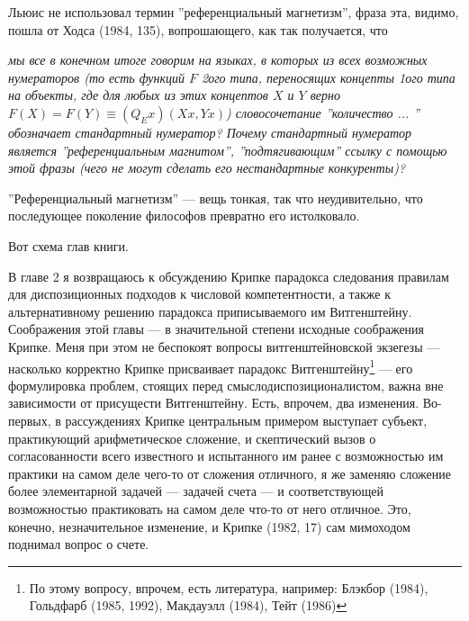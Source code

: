 \documentclass[12pt]{book}
\begin{document}
Льюис не использовал термин ''референциальный магнетизм'', фраза эта, видимо, пошла от Ходса (1984, 135), вопрошающего, как так получается, что

\smallskip

\textit{мы все в конечном итоге говорим на языках, в которых из всех возможных нумераторов (то есть функций \begin{math}F\end{math} 2ого типа, переносящих концепты 1ого типа на объекты, где для любых из этих концептов \begin{math}X\end{math} и \begin{math}Y\end{math} верно \begin{math}F(X)=F(Y)\equiv (Q_{E}x)(Xx, Yx)\end{math}) словосочетание ''количество ... '' обозначает стандартный нумератор? Почему стандартный нумератор является ''референциальным магнитом'', ''подтягивающим'' ссылку с помощью этой фразы (чего не могут сделать его нестандартные конкуренты)?}

\smallskip

''Референциальный магнетизм'' --- вещь тонкая, так что неудивительно, что последующее поколение философов превратно его истолковало.

Вот схема глав книги.

В главе 2 я возвращаюсь к обсуждению Крипке парадокса следования правилам для диспозиционных подходов к числовой компетентности, а также к альтернативному решению парадокса приписываемого им Витгенштейну. Соображения этой главы --- в значительной степени исходные соображения Крипке. Меня при этом не беспокоят вопросы витгенштейновской экзегезы --- насколько корректно Крипке присваивает парадокс Витгенштейну\footnote{По этому вопросу, впрочем, есть литература, например: Блэкбор (1984), Гольдфарб (1985, 1992), Макдауэлл (1984), Тейт (1986)} --- его формулировка проблем, стоящих перед смыслодиспозиционалистом, важна вне зависимости от присущести Витгенштейну. Есть, впрочем, два изменения. Во-первых, в рассуждениях Крипке центральным примером выступает субъект, практикующий арифметическое сложение, и скептический вызов о согласованности всего известного и испытанного им ранее с возможностью им практики на самом деле чего-то от сложения отличного, я же заменяю сложение более элементарной задачей --- задачей счета --- и соответствующей возможностью практиковать на самом деле что-то от него отличное. Это, конечно, незначительное изменение, и Крипке (1982, 17) сам мимоходом поднимал вопрос о счете.
\end{document}
